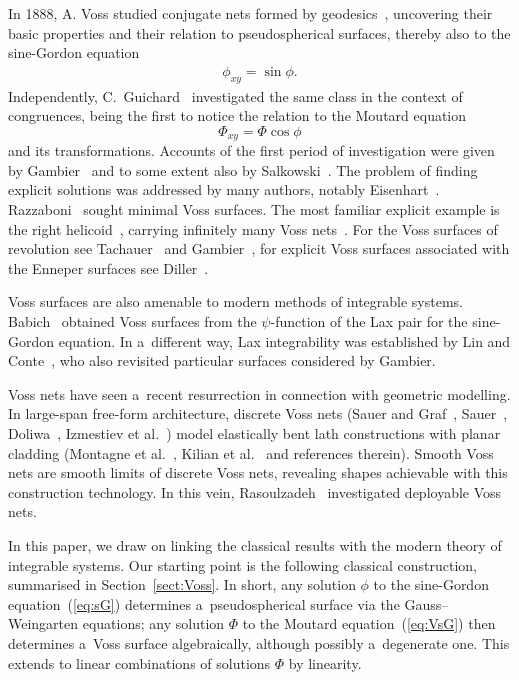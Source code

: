 \documentclass[pdftex]{sigma}
\def\eqref#1{{\rm(\ref{#1})}}
\numberwithin{equation}{section}
\theoremstyle{definition}
\begin{document}
In 1888, A. Voss studied conjugate nets formed by
geodesics~\cite{AV-1888}, uncovering their basic properties and
their relation to pseudospherical surfaces, thereby also
to the sine-Gordon equation
\begin{gather}
\label{eq:sG}
\phi_{xy} = \sin\phi.
\end{gather}
Independently, C.~Guichard~\cite{CG-1890b} investigated the
same class in the context of congruences, being the first to notice
the relation to the Moutard equation
\begin{equation}
\label{eq:VsG}
\Phi_{xy} = \Phi \cos \phi
\end{equation}
and its transformations.
Accounts of the first period of investigation were given by
Gambier~\cite{BG-1931}
and to some extent also by Salkowski~\cite{ES-1924}.
The problem of finding explicit solutions was addressed by
many authors, notably
Eisenhart~\cite{LPE-1906,LPE-1909,LPE-1914,LPE-1915,LPE-1917}.
Razzaboni~\cite{AR-1889} sought minimal Voss surfaces.
The most familiar explicit example is the right helicoid~\cite{AV-1888},
carrying infinitely many Voss nets~\cite{SF-1939,BG-1926}.
For the Voss surfaces of revolution see Tachauer~\cite{AT-1903}
and Gambier~\cite{BG-1927,BG-1931},
for explicit Voss surfaces associated with the Enneper surfaces see
Diller~\cite{JBD-1913}.

Voss surfaces are also amenable to modern methods of integrable
systems.
Babich~\cite{Bab-1996} obtained Voss surfaces from the
$\psi$-function of the Lax pair for the sine-Gordon equation.
In a~different way, Lax integrability was established by Lin and
Conte~\cite{RL-RC-2018}, who also revisited particular
surfaces considered by Gambier.

Voss nets have seen a~recent resurrection
in connection with geometric modelling.
In large-span free-form architecture, discrete Voss nets
(Sauer and Graf~\cite{RS-HG-1931}, Sauer~\cite{RS-1970},
Doliwa~\cite{AD-1999}, Izmestiev et al.\ \cite{Izm})
model elastically bent lath constructions with planar cladding
(Montagne et al.\ \cite{MDTFB-2020,MDTFB-2022},
Kilian et al.\ \cite{KNRRS-2024} and references therein).
Smooth Voss nets are smooth limits of
discrete Voss nets, revealing shapes achievable with this
construction technology.
In this vein, Rasoulzadeh~\cite{AR-2025} investigated
deployable Voss nets.

In this paper, we draw on linking the classical results
with the modern theory of integrable systems.
Our starting point is the following classical construction,
summarised in Section~\ref{sect:Voss}.
In short,
any solution $\phi$ to the sine-Gordon equation~\eqref{eq:sG} determines a~pseudospherical surface via the Gauss--Weingarten equations;
any solution $\Phi$ to the Moutard equation~\eqref{eq:VsG} then
determines a~Voss surface algebraically,
although possibly a~degenerate one.
This extends to linear combinations of solutions $\Phi$ by linearity.
\end{document}
